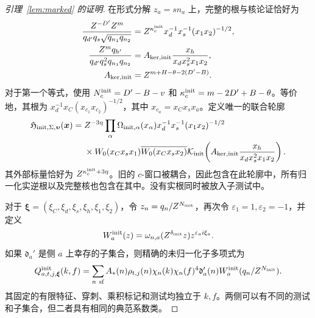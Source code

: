 \documentclass[11pt,a4paper]{article}
\numberwithin{equation}{section}
\numberwithin{figure}{section}
\theoremstyle{definition}
\theoremstyle{remark}
\begin{document}
\begin{proof}[引理~\ref{lem:marked} 的证明]
在形式分解 \(z_a=sn_a\) 上，完整的根与核论证恰好为
\begin{equation}\label{eq:initial-root-kernel}
 \begin{split}
 \frac{Z^{-D'}Z^m}{q_{d'}q_s\sqrt{q_{n_1}q_{n_2}}}
 &=Z^{\kappa_c^{\rm init}}x_d^{-1}x_s^{-1}(x_1x_2)^{-1/2},\\
 \frac{Z^mq_{h'}}{q_{d'}q_s^2q_{n_1}q_{n_2}}
 &=A_{{\rm ker},{\rm init}}\frac{x_h}{x_dx_s^2x_1x_2},\\
 A_{{\rm ker},{\rm init}}&=Z^{m+H-\theta-2(D'-B)}.
 \end{split}
\end{equation}
对于第一个等式，使用 \(N_c^{\rm init}=D'-B-v\) 和 \(\kappa_c^{\rm init}=m-2D'+B-\theta\)。等价地，其根为 \(x_d^{-1}x_C(x_{c_1}x_{c_2})^{-1/2}\)，其中 \(x_{c_a}=x_Cx_sx_a\)。定义唯一的联合轮廓
\begin{equation}\label{eq:initial-joint-profile}
 \begin{split}
 \mathfrak H_{{\rm init},\Sigma,\boldsymbol\upsilon}(\boldsymbol x)
 ={}&Z^{-3\eta}\prod_\alpha\Omega_{{\rm init},\alpha}(x_\alpha)
 x_d^{-1}x_s^{-1}(x_1x_2)^{-1/2}\\
 &\times W_0(x_Cx_sx_1)\overline{W_0(x_Cx_sx_2)}
 \mathcal K_{\rm init}\!\left(
 A_{{\rm ker},{\rm init}}\frac{x_h}{x_dx_s^2x_1x_2}\right).
 \end{split}
\end{equation}
其外部标量恰好为 \(Z^{\kappa_c^{\rm init}+3\eta}\)。旧的 \(c\)-窗口被耦合，因此包含在此轮廓中，所有归一化实逆根以及完整核也包含在其中。没有实根同时被放入子测试中。

对于 \(\boldsymbol\xi=(\xi_C,\xi_d,\xi_s,\xi_h,\xi_1,\xi_2)\)，令 \(z_n=q_n/Z^{N_{\rm init}}\)，再次令 \(\varepsilon_1=1,\varepsilon_2=-1\)，并定义
\[
 W_a^{\rm init}(z)=\omega_{n,a}(Z^{\delta_{\rm init}}z)
                       z^{\varepsilon_a i\xi_a}.
\]
如果 \(\mathfrak d_a'\) 是侧 \(a\) 上幸存的子集合，则精确的未归一化子多项式为
\begin{equation}\label{eq:initial-child-polynomial}
 Q^{\rm init}_{a,t,j,\boldsymbol\xi}(k,f)
 =\sum_{n\ {\rm sf}}A_*(n)\rho_{t,j}(n)
 \chi_n(k)\chi_n(f)^4\mathfrak d_a'(n)
 W_a^{\rm init}(q_n/Z^{N_{\rm init}}).
\end{equation}
其固定的有限特征、穿刺、乘积标记和测试均独立于 \(k,f\)。两侧可以有不同的测试和子集合，但二者具有相同的典范系数类。


\end{proof}
\end{document}
